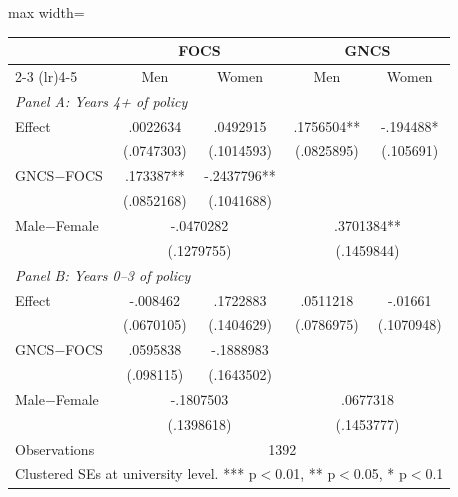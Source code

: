 \begin{adjustbox}{max width=\textwidth}
\begin{tabular}{lcccc}
\toprule
 & \multicolumn{2}{c}{FOCS} & \multicolumn{2}{c}{GNCS} \\
\cmidrule(lr){2-3} \cmidrule(lr){4-5}
 & Men & Women & Men & Women \\
\midrule
\multicolumn{5}{l}{\textit{Panel A: Years 4+ of policy}} \\[0.3em]
Effect & .0022634 & .0492915 & .1756504** & -.194488* \\
 & (.0747303) & (.1014593) & (.0825895) & (.105691) \\[0.5em]
GNCS$-$FOCS & .173387** & -.2437796** & & \\
 & (.0852168) & (.1041688) & & \\
Male$-$Female & \multicolumn{2}{c}{-.0470282} & \multicolumn{2}{c}{.3701384**} \\
 & \multicolumn{2}{c}{(.1279755)} & \multicolumn{2}{c}{(.1459844)} \\[0.5em]
\midrule
\multicolumn{5}{l}{\textit{Panel B: Years 0--3 of policy}} \\[0.3em]
Effect & -.008462 & .1722883 & .0511218 & -.01661 \\
 & (.0670105) & (.1404629) & (.0786975) & (.1070948) \\[0.5em]
GNCS$-$FOCS & .0595838 & -.1888983 & & \\
 & (.098115) & (.1643502) & & \\
Male$-$Female & \multicolumn{2}{c}{-.1807503} & \multicolumn{2}{c}{.0677318} \\
 & \multicolumn{2}{c}{(.1398618)} & \multicolumn{2}{c}{(.1453777)} \\
\midrule
Observations & \multicolumn{4}{c}{1392} \\
\bottomrule
\multicolumn{5}{l}{\footnotesize Clustered SEs at university level. *** p$<$0.01, ** p$<$0.05, * p$<$0.1} \\
\end{tabular}
\end{adjustbox}
